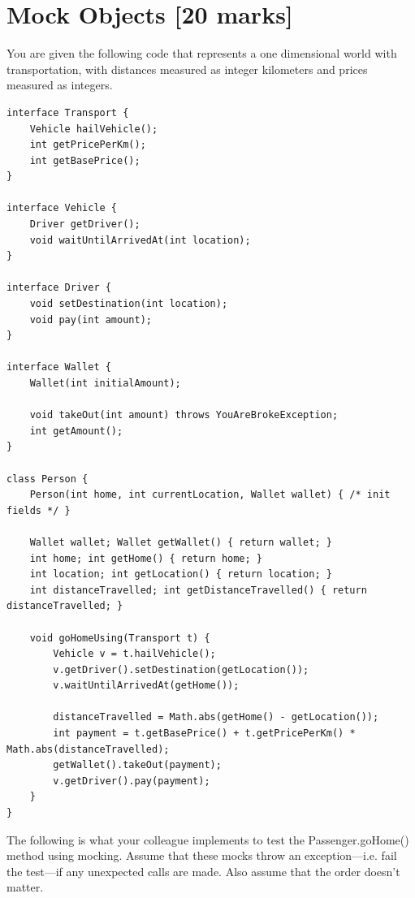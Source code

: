 \documentclass[12pt]{article}
\begin{document}
\newpage
\section{Mock Objects [20 marks]}
You are given the following code that represents a one dimensional world with transportation, with distances measured as integer kilometers and prices measured as integers.

\begin{lstlisting}
interface Transport {
    Vehicle hailVehicle();
    int getPricePerKm();
    int getBasePrice();
}

interface Vehicle {
    Driver getDriver();
    void waitUntilArrivedAt(int location);
}

interface Driver {
    void setDestination(int location);
    void pay(int amount);
}

interface Wallet {
    Wallet(int initialAmount);

    void takeOut(int amount) throws YouAreBrokeException;
    int getAmount();
}

class Person {
    Person(int home, int currentLocation, Wallet wallet) { /* init fields */ }

    Wallet wallet; Wallet getWallet() { return wallet; }
    int home; int getHome() { return home; }
    int location; int getLocation() { return location; }
    int distanceTravelled; int getDistanceTravelled() { return distanceTravelled; }

    void goHomeUsing(Transport t) {
        Vehicle v = t.hailVehicle();
        v.getDriver().setDestination(getLocation());
        v.waitUntilArrivedAt(getHome());

        distanceTravelled = Math.abs(getHome() - getLocation());
        int payment = t.getBasePrice() + t.getPricePerKm() * Math.abs(distanceTravelled);
        getWallet().takeOut(payment);
        v.getDriver().pay(payment);
    }
}
\end{lstlisting}

\newpage
The following is what your colleague implements to test the Passenger.goHome() method using mocking. Assume that these mocks throw an exception---i.e. fail the test---if any unexpected calls are made. Also assume that the order doesn't matter.
\end{document}
